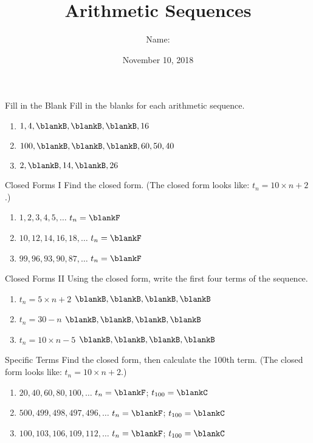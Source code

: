 \documentclass[12pt,letterpaper]{article}
\title{Arithmetic Sequences}
\author{Name: \underline{\hspace{5cm}}}
\date{November 10, 2018}
\begin{document}
\maketitle

\thispagestyle{empty}

\begin{problem}{Fill in the Blank}
 Fill in the blanks for each arithmetic sequence.

\begin{enumerate}[\hspace{.5cm}a.]
\item \(1, 4, \blankB, \blankB, \blankB, 16\)
\item \(100, \blankB, \blankB, \blankB, 60, 50, 40\)
\item \(2, \blankB, 14, \blankB, 26\)
\end{enumerate}
\end{problem}

\begin{problem}{Closed Forms I}
 Find the closed form. (The closed form looks like: \(t_n = 10 \times n + 2\).)

\begin{enumerate}[\hspace{.5cm}a.]
\item $1, 2, 3, 4, 5, \ldots$ \hfill $t_n = \blankF$
\item $10, 12, 14, 16, 18, \ldots$ \hfill $t_n = \blankF$
\item $99, 96, 93, 90, 87, \ldots$ \hfill $t_n = \blankF$
\end{enumerate}
\end{problem}

\begin{problem}{Closed Forms II}
 Using the closed form, write the first four terms of the sequence.

\begin{enumerate}[\hspace{.5cm}a.]
\item $t_n = 5 \times n + 2$ \hfill
$\blankB, \blankB, \blankB, \blankB$
\item $t_n = 30 - n$ \hfill
$\blankB, \blankB, \blankB, \blankB$
\item $t_n = 10 \times n - 5$ \hfill
$\blankB, \blankB, \blankB, \blankB$
\end{enumerate}
\end{problem}

\begin{problem}{Specific Terms}
 Find the closed form, then calculate the 100th term. (The closed form looks
 like: $t_n = 10 \times n + 2$.)

\begin{enumerate}[\hspace{.5cm}a.]
\item $20, 40, 60, 80, 100, \ldots$ \hfill $t_n = \blankF$;
$t_{100} = \blankC$
\item $500, 499, 498, 497, 496, \ldots$ \hfill $t_n = \blankF$;
$t_{100} = \blankC$
\item $100, 103, 106, 109, 112, \ldots$ \hfill $t_n = \blankF$;
$t_{100} = \blankC$
\end{enumerate}
\end{problem}
\end{document}
